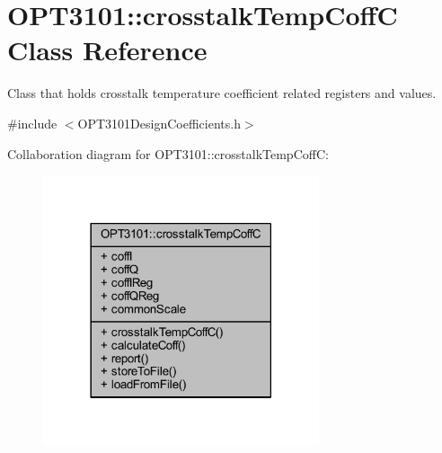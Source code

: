 \hypertarget{class_o_p_t3101_1_1crosstalk_temp_coff_c}{}\section{O\+P\+T3101\+:\+:crosstalk\+Temp\+CoffC Class Reference}
\label{class_o_p_t3101_1_1crosstalk_temp_coff_c}


Class that holds crosstalk temperature coefficient related registers and values.  




{\ttfamily \#include $<$O\+P\+T3101\+Design\+Coefficients.\+h$>$}



Collaboration diagram for O\+P\+T3101\+:\+:crosstalk\+Temp\+CoffC\+:\nopagebreak
\begin{figure}[H]
\begin{center}
\leavevmode
\includegraphics[width=230pt]{class_o_p_t3101_1_1crosstalk_temp_coff_c__coll__graph}
\end{center}
\end{figure}
